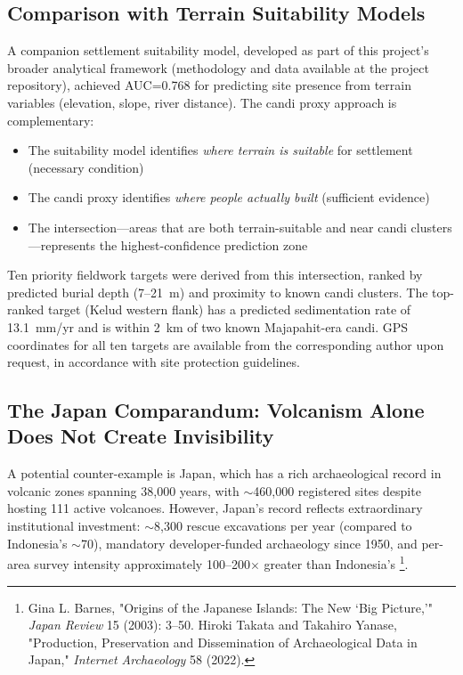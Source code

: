 \documentclass[12pt,a4paper]{article}
\begin{document}
\subsection{Comparison with Terrain Suitability Models}

A companion settlement suitability model, developed as part of this project's broader analytical framework (methodology and data available at the project repository), achieved AUC=0.768 for predicting site presence from terrain variables (elevation, slope, river distance). The candi proxy approach is complementary:

\begin{itemize}
    \item The suitability model identifies \emph{where terrain is suitable} for settlement (necessary condition)
    \item The candi proxy identifies \emph{where people actually built} (sufficient evidence)
    \item The intersection---areas that are both terrain-suitable and near candi clusters---represents the highest-confidence prediction zone
\end{itemize}

Ten priority fieldwork targets were derived from this intersection, ranked by predicted burial depth (7--21~m) and proximity to known candi clusters. The top-ranked target (Kelud western flank) has a predicted sedimentation rate of 13.1~mm/yr and is within 2~km of two known Majapahit-era candi. GPS coordinates for all ten targets are available from the corresponding author upon request, in accordance with site protection guidelines.

\subsection{The Japan Comparandum: Volcanism Alone Does Not Create Invisibility}

A potential counter-example is Japan, which has a rich archaeological record in volcanic zones spanning 38,000 years, with $\sim$460,000 registered sites despite hosting 111 active volcanoes. However, Japan's record reflects extraordinary institutional investment: $\sim$8,300 rescue excavations per year (compared to Indonesia's $\sim$70), mandatory developer-funded archaeology since 1950, and per-area survey intensity approximately 100--200$\times$ greater than Indonesia's \footnote{Gina L. Barnes, "Origins of the Japanese Islands: The New `Big Picture,'" \emph{Japan Review} 15 (2003): 3--50. Hiroki Takata and Takahiro Yanase, "Production, Preservation and Dissemination of Archaeological Data in Japan," \emph{Internet Archaeology} 58 (2022).}.
\end{document}
